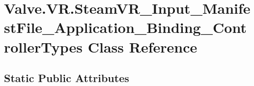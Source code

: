 \hypertarget{class_valve_1_1_v_r_1_1_steam_v_r___input___manifest_file___application___binding___controller_types}{}\section{Valve.\+V\+R.\+Steam\+V\+R\+\_\+\+Input\+\_\+\+Manifest\+File\+\_\+\+Application\+\_\+\+Binding\+\_\+\+Controller\+Types Class Reference}
\label{class_valve_1_1_v_r_1_1_steam_v_r___input___manifest_file___application___binding___controller_types}
\subsection*{Static Public Attributes}
